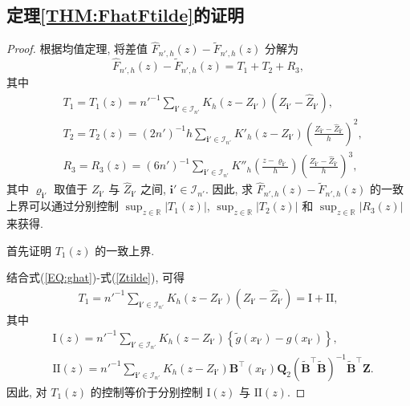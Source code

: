 \documentclass[a4paper,openay,14pt]{ctexbook}
\numberwithin{equation}{section}
\numberwithin{lem}{section}
\begin{document}
\subsection{定理\ref{THM:FhatFtilde}的证明}
\begin{proof}
根据均值定理, 将差值 $\hat{F}_{n',h}(z)-\tilde{F}_{n',h}(z)$ 分解为
\begin{equation}\label{EQ:Fnhhat-Fnhtilde}
    \hat{F}_{n',h}(z)-\tilde{F}_{n',h}(z)=T_1+T_2+R_3,
\end{equation}
其中
\begin{align*}
    &T_1=T_1(z)=n'^{-1}\sum_{\mathbf{i}'\in\mathcal{I}_{n'}}K_h\left(z-Z_{\mathbf{i}'}\right)\left(Z_{\mathbf{i}'}-\hat{Z}_{\mathbf{i}'}\right),\\
    &T_2=T_2(z)=(2n')^{-1}h\sum_{\mathbf{i}'\in\mathcal{I}_{n'}}K'_h\left(z-Z_{\mathbf{i}'}\right)\left(\frac{Z_{\mathbf{i}'}-\hat{Z}_{\mathbf{i}'}}{h}\right)^2,\\
    &R_3=R_3(z)=(6n')^{-1}\sum_{\mathbf{i}'\in\mathcal{I}_{n'}}K''_h\left(\frac{z-\varrho_{\mathbf{i}'}}{h}\right)\left(\frac{Z_{\mathbf{i}'}-\hat{Z}_{\mathbf{i}'}}{h}\right)^3,
\end{align*}
其中 $\varrho_{\mathbf{i}'}$ 取值于 $Z_{\mathbf{i}'}$ 与 $\hat{Z}_{\mathbf{i}'}$ 之间, $\mathbf{i}'\in\mathcal{I}_{n'}$. 因此, 求 $\hat{F}_{n',h}(z)-\tilde{F}_{n',h}(z)$ 的一致上界可以通过分别控制 $\sup_{z\in\mathbb{R}}|T_1(z)|$, $\sup_{z\in\mathbb{R}}|T_2(z)|$ 和 $\sup_{z\in\mathbb{R}}|R_3(z)|$ 来获得.

首先证明 $T_1(z)$ 的一致上界.

结合式(\ref{EQ:ghat})-式(\ref{Ztilde}), 可得
\begin{align}\label{EQ:T1}
    T_1
    =n'^{-1}\sum_{\mathbf{i}'\in\mathcal{I}_{n'}}
      K_h(z-Z_{\mathbf{i}'})\left(Z_{\mathbf{i}'}-\hat{Z}_{\mathbf{i}'}\right)
    =\mathrm{I}+\mathrm{II},
\end{align}
其中
\begin{align*}
    &\mathrm{I}(z)
    =n'^{-1}\sum_{\mathbf{i}'\in\mathcal{I}_{n'}}
      K_h(z-Z_{\mathbf{i}'})
      \left\{\tilde{g}(x_{\mathbf{i}'})-g(x_{\mathbf{i}'})\right\},\\
    &\mathrm{II}(z)
    =n'^{-1}\sum_{\mathbf{i}'\in\mathcal{I}_{n'}}
      K_h(z-Z_{\mathbf{i}'})
      \mathbf{B}^{\top}(x_{\mathbf{i}'})\mathbf{Q}_2
      \left(\tilde{\mathbf{B}}^{\top}\tilde{\mathbf{B}}\right)^{-1}
      \tilde{\mathbf{B}}^{\top}\mathbf{Z}.
\end{align*}
因此, 对 $T_1(z)$ 的控制等价于分别控制 $\mathrm{I}(z)$ 与 $\mathrm{II}(z)$.


\end{proof}
\end{document}
